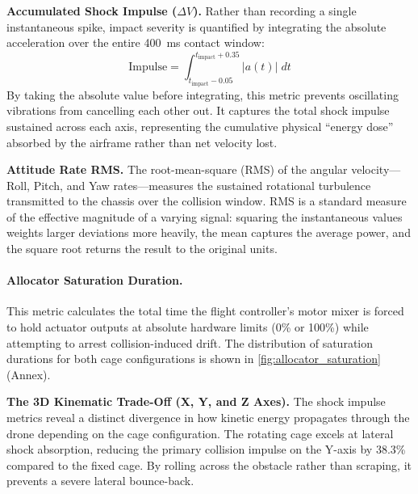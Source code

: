 \medskip
\begin{tcolorbox}[breakable, colback=gray!8, colframe=black!30, arc=0pt,
    boxsep=10pt, left=4pt, right=4pt, top=4pt, bottom=4pt,
    before skip=6pt, after skip=6pt]
\textbf{Accumulated Shock Impulse ($\Delta V$).}
Rather than recording a single instantaneous spike, impact severity is quantified by integrating the absolute acceleration over the entire 400~ms contact window:
\begin{equation}
    \text{Impulse} = \int_{t_{\text{impact}}-0.05}^{t_{\text{impact}}+0.35} |a(t)| \; dt
\end{equation}
By taking the absolute value before integrating, this metric prevents oscillating vibrations from cancelling each other out. It captures the total shock impulse sustained across each axis, representing the cumulative physical ``energy dose'' absorbed by the airframe rather than net velocity lost.

\textbf{Attitude Rate RMS.}
The root-mean-square (RMS) of the angular velocity---Roll, Pitch, and Yaw rates---measures the sustained rotational turbulence transmitted to the chassis over the collision window. RMS is a standard measure of the effective magnitude of a varying signal: squaring the instantaneous values weights larger deviations more heavily, the mean captures the average power, and the square root returns the result to the original units.
\end{tcolorbox}
\medskip

\paragraph{Allocator Saturation Duration.}
This metric calculates the total time the flight controller's motor mixer is forced to hold actuator outputs at absolute hardware limits (0\% or 100\%) while attempting to arrest collision-induced drift. The distribution of saturation durations for both cage configurations is shown in \autoref{fig:allocator_saturation} (Annex).

\medskip
\noindent\textbf{The 3D Kinematic Trade-Off (X, Y, and Z Axes).}
The shock impulse metrics reveal a distinct divergence in how kinetic energy propagates through the drone depending on the cage configuration. The rotating cage excels at lateral shock absorption, reducing the primary collision impulse on the Y-axis by 38.3\% compared to the fixed cage. By rolling across the obstacle rather than scraping, it prevents a severe lateral bounce-back.

